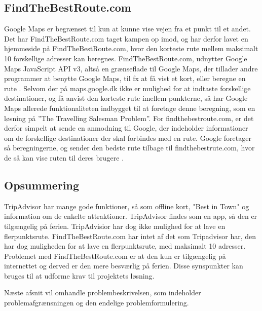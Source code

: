\subsection{FindTheBestRoute.com}
Google Maps er begrænset til kun at kunne vise vejen fra et punkt til et andet. Det har FindTheBestRoute.com taget kampen op imod, og har derfor lavet en hjemmeside på FindTheBestRoute.com, hvor den korteste rute mellem maksimalt 10 forskellige adresser kan beregnes. FindTheBestRoute.com, udnytter Google Maps JavaScript API v3, altså en grænseflade til Google Maps, der tillader andre programmer at benytte Google Maps, til fx at få vist et kort, eller beregne en rute \citep{ftbr}.\newline
Selvom der på maps.google.dk ikke er mulighed for at indtaste forskellige destinationer, og få anvist den korteste rute imellem punkterne, så har Google Maps allerede funktionaliteten indbygget til at foretage denne beregning, som en løsning på ”The Travelling Salesman Problem”.\newline
For findthebestroute.com, er det derfor simpelt at sende en anmodning til Google, der indeholder informationer om de forskellige destinationer der skal forbindes med en rute. Google foretager så beregningerne, og sender den bedste rute tilbage til findthebestrute.com, hvor de så kan vise ruten til deres brugere \citep{googleapi}. \newline
\subsection{Opsummering}
TripAdvisor har mange gode funktioner, så som offline kort, "Best in Town" og information om de enkelte attraktioner. TripAdvisor findes som en app, så den er tilgængelig på ferien. TripAdvisior har dog ikke mulighed for at lave en flerpunktsrute. \newline
FindTheBestRoute.com har intet af det som Tripadvisor har, den har dog muligheden for at lave en flerpunktsrute, med maksimalt 10 adresser. Problemet med FindTheBestRoute.com er at den kun er tilgængelig på internettet og derved er den mere besværlig på ferien.\newline
Disse synspunkter kan bruges til at udforme krav til projektets løsning. \newline

Næste afsnit vil omhandle problembeskrivelsen, som indeholder problemafgrænsningen og den endelige problemformulering. 
